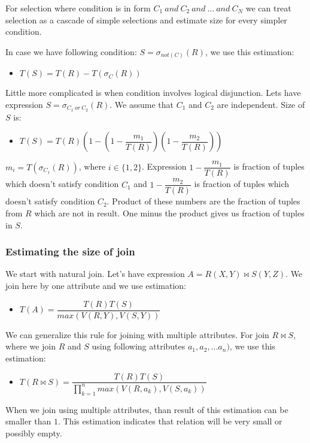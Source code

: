 For selection where condition is in form $C_1~and~C_2~and~...~and~C_N$ we can treat selection as a cascade of simple selections and estimate size for every simpler condition.

In case we have following condition: $S=\sigma_{not(C)}(R)$, we use this estimation:
\begin{itemize}
\item $T(S)=T(R)-T(\sigma_C(R))$
\end{itemize}

Little more complicated is when condition involves logical disjunction. Lets have expression $S=\sigma_{C_1~or~C_2}(R)$. We assume that $C_1$ and $C_2$ are independent. Size of $S$ is:

\begin{itemize}
\item $T(S)=T(R)(1-(1-\dfrac{m_1}{T(R)})(1-\dfrac{m_2}{T(R)}))$
\end{itemize}

$m_i=T(\sigma_{C_1}(R))$, where $i\in\{1,2\}$. Expression $1-\dfrac{m_1}{T(R)}$ is fraction of tuples which doesn't satisfy condition $C_1$ and $1-\dfrac{m_2}{T(R)}$ is fraction of tuples which doesn't satisfy condition $C_2$. Product of these numbers are the fraction of tuples from $R$ which are not in result. One minus the product gives us fraction of tuples in $S$.

\subsubsection{Estimating the size of join}
\label{join}
We start with natural join. Let's have expression $A=R(X,Y)\Join S(Y,Z)$. We join here by one attribute and we use estimation:

\begin{itemize}
\item $T(A)=\dfrac{T(R)T(S)}{max(V(R,Y),V(S,Y))}$
\end{itemize}

We can generalize this rule for joining with multiple attributes. For join $R\Join S$, where we join $R$ and $S$ using following attributes $a_1,a_2,...a_n)$, we use this estimation:

\begin{itemize}
\item $T(R\Join S)=\dfrac{T(R)T(S)}{\prod_{k=1}^{n}{max(V(R,a_k),V(S,a_k))}}$
\end{itemize}

When we join using multiple attributes, than result of this estimation can be smaller than $1$. This estimation indicates that relation will be very small or possibly empty.

